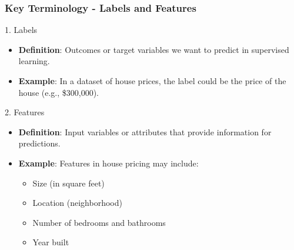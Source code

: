 \documentclass[aspectratio=169]{beamer}
\begin{document}
\begin{frame}[fragile]
    \frametitle{Key Terminology - Labels and Features}
    \begin{block}{1. Labels}
        \begin{itemize}
            \item \textbf{Definition}: Outcomes or target variables we want to predict in supervised learning.
            \item \textbf{Example}: In a dataset of house prices, the label could be the price of the house (e.g., \$300,000).
        \end{itemize}
    \end{block}

    \begin{block}{2. Features}
        \begin{itemize}
            \item \textbf{Definition}: Input variables or attributes that provide information for predictions.
            \item \textbf{Example}: Features in house pricing may include:
            \begin{itemize}
                \item Size (in square feet)
                \item Location (neighborhood)
                \item Number of bedrooms and bathrooms
                \item Year built
            \end{itemize}
        \end{itemize}
    \end{block}
\end{frame}
\end{document}
